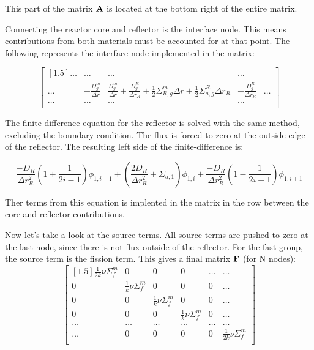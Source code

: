 \documentclass[../main.tex]{subfiles}
\begin{document}
This part of the matrix $\mathbf{A}$ is located at the bottom right of the entire matrix.

	
Connecting the reactor core and reflector is the interface node.  This means contributions from both materials must be accounted for at that point.  The following represents the interface node implemented in the matrix:


\[
	\begin{bmatrix}[1.5]
		 \dots & \dots & \dots  & \dots \\
		\dots & -\frac{D^m_g}{\Delta r} & \frac{D^m_g}{\Delta r} + \frac{D^R_g}{\Delta r_R} + \frac{1}{2} \Sigma^m_{R,g} \Delta r + \frac{1}{2} \Sigma^R_{a,g} \Delta r_R & -\frac{D^R_g}{\Delta r_R}  & \dots \\
	\dots & \dots & \dots  & \dots \\	
	\end{bmatrix}
	\]

	
The finite-difference equation for the reflector is solved with the same method, excluding the boundary condition.  The flux is forced to zero at the outside edge of the reflector.  The resulting left side of the finite-difference is:

	\begin{equation}
	\frac{-D_R}{\Delta r_R^2} \left( 1 + \frac{1}{2i-1} \right) \phi_{1,i-1} + \left( \frac{2D_R}{\Delta r_R^2} + \Sigma_{a,1} \right) \phi_{1,i} + \frac{-D_R}{\Delta r_R^2} \left( 1 - \frac{1}{2i-1} \right) \phi_{1,i+1}
	\end{equation}
	
Ther terms from this equation is implented in the matrix in the row between the core and reflector contributions.

Now let's take a look at the source terms.  All source terms are pushed to zero at the last node, since there is not flux outside of the reflector.  For the fast group, the source term  is the fission term.  This gives a final matrix $\mathbf{F}$ (for N nodes):
	\[
	\begin{bmatrix}[1.5]
		\frac{1}{2k} \nu \Sigma^m_f  & 0 & 0 & 0 & \dots & \dots \\
		0 & \frac{1}{k} \nu \Sigma^m_f  & 0 & 0 & 0 & \dots \\
		0 & 0 & \frac{1}{k} \nu \Sigma^m_f  & 0 & 0 & \dots\\
		0 & 0 & 0 & \frac{1}{k} \nu \Sigma^m_f  & 0 & \dots \\
		\dots & \dots & \dots & \dots & \dots & \dots \\
		\dots & 0 & 0 & 0 & 0 & \frac{1}{2k} \nu \Sigma^m_f  \\
	\end{bmatrix}
	\]
	
\end{document}
